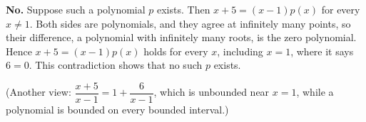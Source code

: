 \textbf{No.} Suppose such a polynomial $p$ exists. Then $x+5=(x-1)p(x)$ for every $x\ne1$. Both sides are polynomials, and they agree at infinitely many points, so their difference, a polynomial with infinitely many roots, is the zero polynomial. Hence $x+5=(x-1)p(x)$ holds for every $x$, including $x=1$, where it says $6=0$. This contradiction shows that no such $p$ exists.

(Another view: $\dfrac{x+5}{x-1}=1+\dfrac{6}{x-1}$, which is unbounded near $x=1$, while a polynomial is bounded on every bounded interval.)
